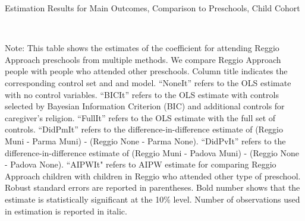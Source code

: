 
\begin{landscape}

\begin{table}[H] \caption{Estimation Results for Main Outcomes, Comparison to Preschools, Child Cohort} \label{ols-M-child-reg-pres}
\scalebox{0.8}{}
\vspace{1ex} \\
\footnotesize\raggedright{Note: This table shows the estimates of the coefficient for attending Reggio Approach preschools from multiple methods. We compare Reggio Approach people with people who attended other preschools. Column title indicates the corresponding control set and and model. ``NoneIt'' refers to the OLS estimate with no control variables. ``BICIt'' refers to the OLS estimate with controls selected by Bayesian Information Criterion (BIC) and additional controls for caregiver's religion. ``FullIt'' refers to the OLS estimate with the full set of controls. ``DidPmIt'' refers to the difference-in-difference estimate of (Reggio Muni - Parma Muni) - (Reggio None - Parma None). ``DidPvIt'' refers to the difference-in-difference estimate of (Reggio Muni - Padova Muni) - (Reggio None - Padova None). ``AIPWIt" refers to AIPW estimate for comparing Reggio Approach children with children in Reggio who attended other type of preschool. Robust standard errors are reported in parentheses. Bold number shows that the estimate is statistically significant at the 10\% level. Number of observations used in estimation is reported in italic.}

\end{table}



\end{landscape}
